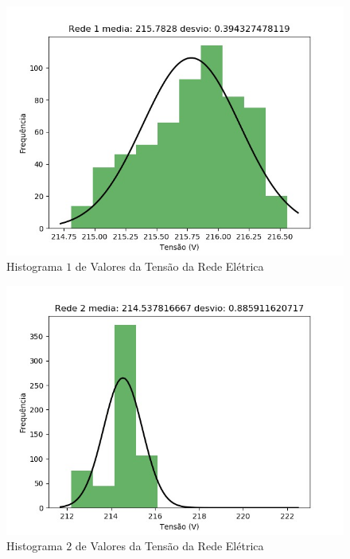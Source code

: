 \documentclass[14pt, oneside]{book}
\theoremstyle{definition}
\begin{document}
                \begin{figure}[H]
                        \centering
                        \includegraphics[scale = 0.6]{22.jpeg}
                        \caption{Histograma $1$ de Valores da Tensão da Rede Elétrica}
                        \label{22}
                    \end{figure}
                
                \begin{figure}[H]
                        \centering
                        \includegraphics[scale = 0.6]{11.jpeg}
                        \caption{Histograma $2$ de Valores da Tensão da Rede Elétrica}
                        \label{11}
                    \end{figure}
                
\end{document}

